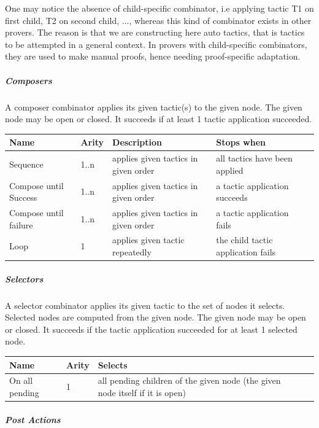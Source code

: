 One may notice the absence of child-specific combinator, i.e applying tactic T1 on first child, T2 on second child, ..., whereas this kind of combinator exists in other provers. The reason is that we are constructing here auto tactics, that is tactics to be attempted in a general context. In provers with child-specific combinators, they are used to make manual proofs, hence needing proof-specific adaptation.

\subparagraph{Composers}

A composer combinator applies its given tactic(s) to the given node. The given node may be open or closed. It succeeds if at least 1 tactic application succeeded. 

\begin{center}
    \begin{tabular}{ | l | l | l | l | p{5cm} |}
    \hline
	Name & Arity & Description & Stops when  \\ \hline
	Sequence & 1..n  & applies given tactics in given order & all tactics have been applied  \\ \hline
	Compose until Success & 1..n  & applies given tactics in given order & a tactic application succeeds \\ \hline
	Compose until failure  & 1..n  & applies given tactics in given order & a tactic application fails \\ \hline
	Loop & 1 & applies given tactic repeatedly & the child tactic application fails \\ \hline
    \end{tabular}
\end{center}

\subparagraph{Selectors}

A selector combinator applies its given tactic to the set of nodes it selects. Selected nodes are computed from the given node. The given node may be open or closed. It succeeds if the tactic application succeeded for at least 1 selected node. 

\begin{center}
    \begin{tabular}{ | l | l | l | p{5cm} |}
    \hline
	Name & Arity & Selects \\ \hline
	On all pending  & 1 & all pending children of the given node (the given node itself if it is open) \\ \hline
    \end{tabular}
\end{center}

\subparagraph{Post Actions}

